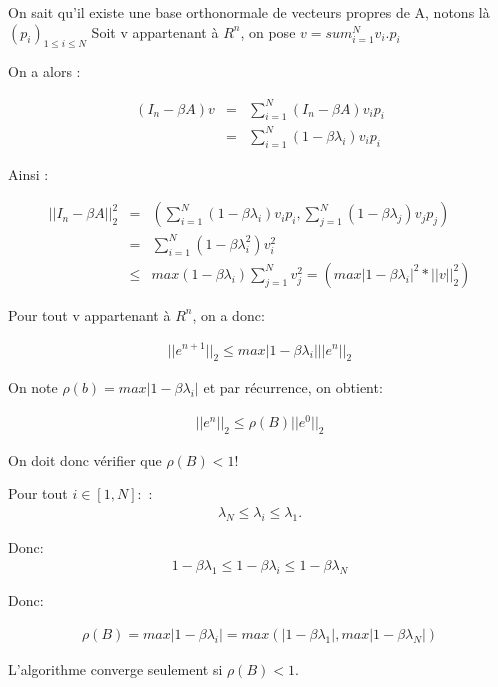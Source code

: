 \documentclass[a4paper,11pt]{article}
\begin{document}
On sait qu'il  existe une base orthonormale de vecteurs propres  de A, notons là
$(p_i)_{1\leq i\leq N}$
Soit v appartenant à $R^{n}$, on pose $v = sum_{i=1}^N{v_i . p_i}$

On a alors : 

\begin{eqnarray*}
  (I_n - \beta A) v &=& \sum_{i=1}^N (I_n-\beta A) v_i p_i\\
  & =& \sum_{i=1}^N(1-\beta \lambda_i) v_i p_i
\end{eqnarray*}


Ainsi :

\begin{eqnarray*}
  ||I_n - \beta A ||^2_2 	&=& (\sum_{i=1}^N(1-\beta \lambda_i) v_i p_i,\sum_{j=1}^N(1-\beta \lambda_j) v_j p_j)\\
  &=& \sum_{i=1}^N(1-\beta \lambda_i^2) v_i^2\\
  &\leq& max (1-\beta \lambda_i) \sum_{j=1}^N v_j^2 = (max |1-\beta \lambda_i|^2 * ||v||_2^2)
\end{eqnarray*}

Pour tout v appartenant à $R^n$, on a donc:

\begin{eqnarray*}
  ||e^{n+1}||_2 \leq max |1-\beta \lambda_i| ||e^n||_2
\end{eqnarray*}

On note $\rho (b) = max |1-\beta \lambda_i|$
et par récurrence, on obtient:

\begin{eqnarray*}
  ||e^{n}||_2 \leq \rho(B) ||e^0||_2
\end{eqnarray*}


On doit donc vérifier que $\rho (B) < 1$!

Pour tout $i \in [1,N]:$ :
\begin{eqnarray*}
  \lambda_N\leq\lambda_i\leq\lambda_1.
\end{eqnarray*}


Donc:
\begin{eqnarray*}
  1-\beta \lambda_1\leq1- \beta \lambda_i\leq 1 - \beta \lambda_N
\end{eqnarray*}

Donc:

\begin{eqnarray*}
  \rho (B) = max |1-\beta \lambda_i| = max (|1-\beta \lambda_1|, max |1-\beta \lambda_N|)
\end{eqnarray*}

L'algorithme converge seulement si $\rho(B)<1$.
\end{document}
